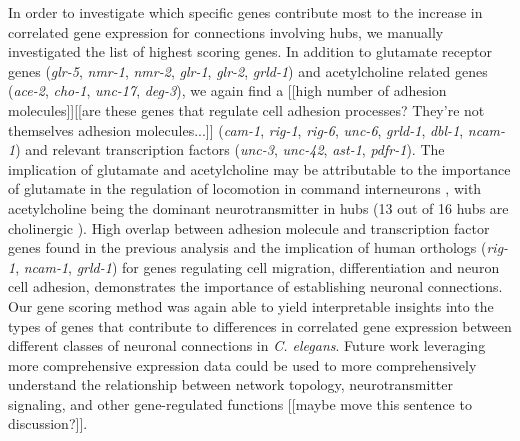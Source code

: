 \documentclass[10pt,letterpaper]{article}
\begin{document}
{In order to investigate which specific genes contribute most to the increase in correlated gene expression for connections involving hubs, we manually investigated the list of highest scoring genes.
In addition to glutamate receptor genes (\emph{glr-5}, \emph{nmr-1}, \emph{nmr-2}, \emph{glr-1}, \emph{glr-2}, \emph{grld-1})
and acetylcholine related genes (\emph{ace-2}, \emph{cho-1}, \emph{unc-17}, \emph{deg-3}),
we again find a [[high number of adhesion molecules]][[are these genes that regulate cell adhesion processes? They're not themselves adhesion molecules...]] (\emph{cam-1}, \emph{rig-1}, \emph{rig-6}, \emph{unc-6}, \emph{grld-1}, \emph{dbl-1}, \emph{ncam-1})
and relevant transcription factors (\emph{unc-3}, \emph{unc-42}, \emph{ast-1}, \emph{pdfr-1}).
The implication of glutamate and acetylcholine may be attributable to the importance of glutamate in the regulation of locomotion in command interneurons \cite{Choi2015, Zheng1999}, with acetylcholine being the dominant neurotransmitter in hubs (13 out of 16 hubs are cholinergic \cite{Pereira:2015er}).
High overlap between adhesion molecule and transcription factor genes found in the previous analysis and the implication of human orthologs (\emph{rig-1}, \emph{ncam-1}, \emph{grld-1}) \cite{Harris:2009kd} for genes regulating cell migration, differentiation and neuron cell adhesion, demonstrates the importance of establishing neuronal connections.
Our gene scoring method was again able to yield interpretable insights into the types of genes that contribute to differences in correlated gene expression between different classes of neuronal connections in \emph{C. elegans}.
Future work leveraging more comprehensive expression data could be used to more comprehensively understand the relationship between network topology, neurotransmitter signaling, and other gene-regulated functions [[maybe move this sentence to discussion?]].

}
\end{document}
